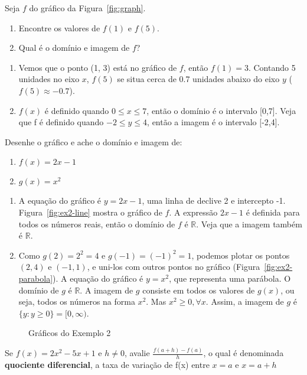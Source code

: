  Seja $f$ do gráfico da Figura~\ref{fig:graph}.
\begin{enumerate}[label=(\alph*)]
  \item Encontre os valores de $f(1)$ e $f(5)$.
  \item Qual é o domínio e imagem de $f$?
\end{enumerate}
\solution
\begin{enumerate}[label=(\alph*)]
  \item Vemos que o ponto (1, 3) está no gráfico de $f$, então $f(1) = 3$. Contando 5 unidades no eixo $x$, $f(5)$ se situa cerca de 0.7 unidades abaixo do eixo $y$ ($f(5)\approx-0.7$).
  \item $f(x)$ é definido quando $0\leq x \leq 7$, então o domínio é o intervalo [0,7]. Veja que f é definido quando $-2\leq y \leq 4$, então a imagem é o intervalo [-2,4].
\end{enumerate}

 Desenhe o gráfico e ache o domínio e imagem de:
\vspace{-0.4cm}\begin{multicols}{2}
  \begin{enumerate}[label=(\alph*)]
    \item $f(x)=2x-1$
    \item $g(x)=x^2$
  \end{enumerate}
\end{multicols}\vspace{-0.3cm}
\solution
\begin{enumerate}[label=(\alph*)]
  \item A equação do gráfico é $y=2x-1$, uma linha de declive 2 e intercepto -1. Figura~\ref{fig:ex2-line} mostra o gráfico de $f$. A expressão $2x-1$ é definida para todos os números reais, então o domínio de $f$ é $\mathds{R}$. Veja que a imagem também é $\mathds{R}$.
  \item Como $g(2)= 2^2 = 4$ e $g(-1) = (-1)^2 = 1$, podemos plotar os pontos $(2,4)$ e $(-1,1)$, e uni-los com outros pontos no gráfico (Figura~\ref{fig:ex2-parabola}). A equação do gráfico é $y=x^2$, que representa uma parábola. O domínio de $g$ é $\mathds{R}$. A imagem de $g$ consiste em todos os valores de $g(x)$, ou seja, todos os números na forma $x^2$. Mas $x^2\geq 0, \forall x$. Assim, a imagem de $g$ é $\{y:y\geq 0\} = [0,\infty)$.\vspace{-0.3cm}
\end{enumerate}
\begin{figure}[!ht]
  \centering
  \caption{Gráficos do Exemplo 2}
\end{figure}\vspace{-0.4cm}
 Se $f(x)=2x^2-5x+1$ e $h\neq 0$, avalie $\displaystyle\frac{f(a+h)-f(a)}{h}$, o qual é denominada \textbf{quociente diferencial}, a taxa de variação de f(x) entre $x=a$ e $x=a+h$

